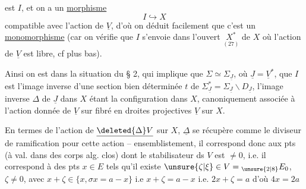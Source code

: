 est $I$, et on a un  \uline{morphisme}
\[
 I\hookrightarrow X \tag*{(26)}
\]
 compatible avec l'action de $\underline V$, d'où on déduit facilement que c'est un \uline{monomorphisme} (car on vérifie que $I$ s'envoie dans l'ouvert  $\underset{(27)}{X^*}$ de $X$ où l'action de $\underline V$ est libre, cf plus bas).

Ainsi on est dans la situation du § 2, qui implique que $\Sigma\simeq\Sigma_{\underline J}$, où $\underline J=\underline V^*$, que $I$ est l'image inverse d'une section bien déterminée $t$ de $\Sigma^*_{\underline J}=\Sigma_{\underline J}\smallsetminus D_{\underline J}$, l'image inverse $\Delta$ de $\underline J$ dans $X$ étant  la configuration  dans $X$, canoniquement associée à l'action donnée de $\underline V$ sur  fibré en droites projectives $\underline V$ sur $X$.

En termes de l'action de $\underline{\deleted{\Delta}V}$ sur $X$, $\underline\Delta$ se récupère comme le diviseur de ramification pour cette action -- ensemblistement, il correspond donc aux pts (à val. dans des corps alg. clos) dont le stabilisateur ds $V$ est $\ne 0$, i.e. il correspond à des pts $x\in E$ tels qu'il existe $\unsure{\zeta|\xi}\in V={}_{\unsure{2|8}}E_0$, $\zeta\ne0$, avec $x+\zeta\in\{x,\sigma x=a-x\}$ i.e $x+\zeta=a-x$ i.e. $2x+\zeta=a$ d'où $4x=2a$  
